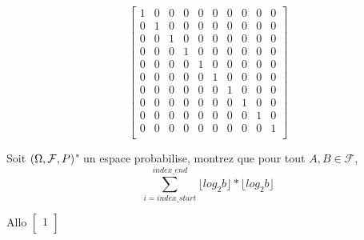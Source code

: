 \documentclass[12pt,addpoints]{article}
\begin{document}
\[ 
\left[ {\begin{array}{cccccccccc}
    1 & 0 & 0 & 0 & 0 & 0 & 0 & 0 & 0 & 0  \\
    0 & 1 & 0 & 0 & 0 & 0 & 0 & 0 & 0 & 0  \\
    0 & 0 & 1 & 0 & 0 & 0 & 0 & 0 & 0 & 0  \\
    0 & 0 & 0 & 1 & 0 & 0 & 0 & 0 & 0 & 0  \\
    0 & 0 & 0 & 0 & 1 & 0 & 0 & 0 & 0 & 0  \\
    0 & 0 & 0 & 0 & 0 & 1 & 0 & 0 & 0 & 0  \\
    0 & 0 & 0 & 0 & 0 & 0 & 1 & 0 & 0 & 0  \\
    0 & 0 & 0 & 0 & 0 & 0 & 0 & 1 & 0 & 0  \\
    0 & 0 & 0 & 0 & 0 & 0 & 0 & 0 & 1 & 0  \\
    0 & 0 & 0 & 0 & 0 & 0 & 0 & 0 & 0 & 1  \\
\end{array} } \right]
\]

Soit $( \ohm ,\mathcal{F} ,P)$" un espace probabilise, montrez que pour tout $A,B \in \mathcal{F}$,\\


\[ \sum\limits_{i = index\_start}^{index\_end} \lfloor log_{2} b \rfloor * \lfloor log_{2} b \rfloor 
\]

Allo $ 
\left[ {\begin{array}{c}
    1  \\
\end{array} } \right]
$


%
\end{document}
